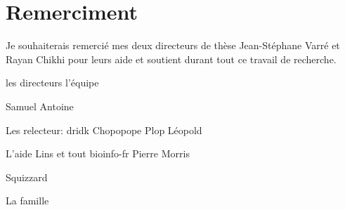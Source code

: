 \documentclass[main.tex]{subfiles}
\begin{document}
\section*{Remerciment}
%

Je souhaiterais remercié mes deux directeurs de thèse Jean-Stéphane Varré et Rayan Chikhi pour leurs aide et soutient  durant tout ce travail de recherche. 

les directeurs
l'équipe

Samuel
Antoine

Les relecteur:
dridk
Chopopope
Plop
Léopold

L'aide 
Lins et tout bioinfo-fr
Pierre Morris

Squizzard

La famille
\end{document}

